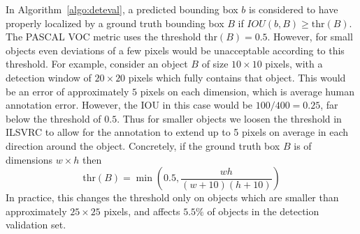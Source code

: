 

In Algorithm~\ref{algo:deteval}, a predicted bounding box $b$ is considered to have properly localized by a
ground truth bounding box $B$ if $IOU(b,B) \geq \mbox{thr}(B)$. The PASCAL VOC metric uses the threshold $\mbox{thr}(B) = 0.5$.
However,  for small objects even deviations of a few pixels would be unacceptable
  according to this threshold. For example, consider an object $B$ of size
  $10 \times 10$ pixels, with a detection window of $20 \times 20$ pixels which fully
  contains that object.  This would be an error of approximately $5$ pixels on each
  dimension, which is average human annotation error. However, the IOU
  in this case would be $100/400 = 0.25$, far below the threshold of $0.5$. Thus for
  smaller objects we loosen the threshold in ILSVRC to allow for the annotation
  to extend up to 5 pixels on average in each direction around the
object. Concretely, if the ground truth box $B$ is of dimensions $w \times h$ then
\begin{equation}
\label{eq:thr}
\mbox{thr}(B) = \min \left (0.5, \frac{w h}{(w+10)(h+10)} \right )
\end{equation}
 In practice, this changes the threshold only on objects which are
  smaller than approximately $25\times 25$ pixels, and affects $5.5\%$ of objects in the
 detection validation set.

